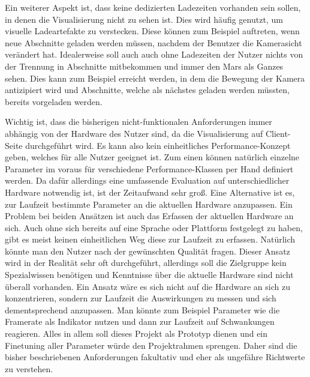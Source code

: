 Ein weiterer Aspekt ist, dass keine dedizierten Ladezeiten vorhanden sein sollen, in denen die Visualisierung nicht zu sehen ist. Dies wird häufig genutzt, um visuelle Ladeartefakte zu verstecken. Diese können zum Beispiel auftreten, wenn neue Abschnitte geladen werden müssen, nachdem der Benutzer die Kamerasicht verändert hat. Idealerweise soll auch auch ohne Ladezeiten der Nutzer nichts von der Trennung in Abschnitte mitbekommen und immer den Mars als Ganzes sehen. Dies kann zum Beispiel erreicht werden, in dem die Bewegung der Kamera antizipiert wird und Abschnitte, welche als nächstes geladen werden müssten, bereits vorgeladen werden.

Wichtig ist, dass die bisherigen nicht-funktionalen Anforderungen immer abhängig von der Hardware des Nutzer sind, da die Visualisierung auf Client-Seite durchgeführt wird. Es kann also kein einheitliches Performance-Konzept geben, welches für alle Nutzer geeignet ist. Zum einen können natürlich einzelne Parameter im voraus für verschiedene Performance-Klassen per Hand definiert werden. Da dafür allerdings eine umfassende Evaluation auf unterschiedlicher Hardware notwendig ist, ist der Zeitaufwand sehr groß. Eine Alternative ist es, zur Laufzeit bestimmte Parameter an die aktuellen Hardware anzupassen. Ein Problem bei beiden Ansätzen ist auch das Erfassen der aktuellen Hardware an sich. Auch ohne sich bereits auf eine Sprache oder Plattform festgelegt zu haben, gibt es meist keinen einheitlichen Weg diese zur Laufzeit zu erfassen. Natürlich könnte man den Nutzer nach der gewünschten Qualität fragen. Dieser Ansatz wird in der Realität sehr oft durchgeführt, allerdings soll die Zielgruppe kein Spezialwissen benötigen und Kenntnisse über die aktuelle Hardware sind nicht überall vorhanden. Ein Ansatz wäre es sich nicht auf die Hardware an sich zu konzentrieren, sondern zur Laufzeit die Auswirkungen zu messen und sich dementsprechend anzupassen. Man könnte zum Beispiel Parameter wie die Framerate als Indikator nutzen und dann zur Laufzeit auf Schwankungen reagieren. Alles in allem soll dieses Projekt als Prototyp dienen und ein Finetuning aller Parameter würde den Projektrahmen sprengen. Daher sind die bisher beschriebenen Anforderungen fakultativ und eher als ungefähre Richtwerte zu verstehen.

